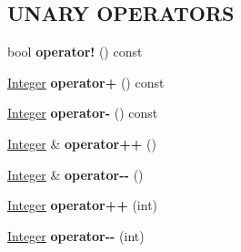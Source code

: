 \subsection*{UNARY OPERATORS}
\label{_amgrpf2e24c7f281b06b6998903e7b5569b30}
 \begin{DoxyCompactItemize}
\item 
\hypertarget{class_integer_af38f3bf1d96507458e5479b24174c08c}{
bool {\bfseries operator!} () const }
\label{class_integer_af38f3bf1d96507458e5479b24174c08c}

\item 
\hypertarget{class_integer_a0af6f7034ff425fd4e2e6863ab13f198}{
\hyperlink{class_integer}{Integer} {\bfseries operator+} () const }
\label{class_integer_a0af6f7034ff425fd4e2e6863ab13f198}

\item 
\hypertarget{class_integer_a56b6d34f3b1e76c59f1413d7d91465b1}{
\hyperlink{class_integer}{Integer} {\bfseries operator-\/} () const }
\label{class_integer_a56b6d34f3b1e76c59f1413d7d91465b1}

\item 
\hypertarget{class_integer_a8a87054359edf761820db65b6a7a7a20}{
\hyperlink{class_integer}{Integer} \& {\bfseries operator++} ()}
\label{class_integer_a8a87054359edf761820db65b6a7a7a20}

\item 
\hypertarget{class_integer_a94e6611a114be34ce3e78c3cb9fde879}{
\hyperlink{class_integer}{Integer} \& {\bfseries operator-\/-\/} ()}
\label{class_integer_a94e6611a114be34ce3e78c3cb9fde879}

\item 
\hypertarget{class_integer_a1666444f09484e482b2f94dd263c7dc9}{
\hyperlink{class_integer}{Integer} {\bfseries operator++} (int)}
\label{class_integer_a1666444f09484e482b2f94dd263c7dc9}

\item 
\hypertarget{class_integer_a000120734ad8ba84af5c5ac7f5f84925}{
\hyperlink{class_integer}{Integer} {\bfseries operator-\/-\/} (int)}
\label{class_integer_a000120734ad8ba84af5c5ac7f5f84925}

\end{DoxyCompactItemize}
